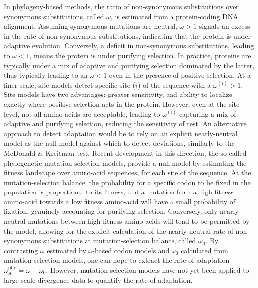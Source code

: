 \documentclass{article}
\newcommand{\rateApop}{\omega_{\mathrm{A}}}
\newcommand{\rateAphy}{\rateApop^{\mathrm{phy}}}
\begin{document}
    In phylogeny-based methods, the ratio of non-synonymous substitutions over synonymous substitutions, called $\omega$, is estimated from a protein-coding DNA alignment\cite{muse_likelihood_1994,goldman_codonbased_1994}.
    Assuming synonymous mutations are neutral, $\omega>1$ signals an excess in the rate of non-synonymous substitutions, indicating that the protein is under adaptive evolution.
    Conversely, a deficit in non-synonymous substitutions, leading to $\omega<1$, means the protein is under purifying selection.
    In practice, proteins are typically under a mix of adaptive and purifying selection dominated by the latter, thus typically leading to an $\omega<1$ even in the presence of positive selection.
    At a finer scale, site models detect specific site ($i$) of the sequence with a $\omega^{(i)}>1$\cite{yang_codonsubstitution_2000, kosiol_patterns_2008}.
    Site models have two advantages: greater sensitivity, and ability to localize exactly where positive selection acts in the protein.
    However, even at the site level, not all amino acids are acceptable, leading to $\omega^{(i)}$ capturing a mix of adaptive and purifying selection, reducing the sensitivity of test.
    An alternative approach to detect adaptation would be to rely on an explicit nearly-neutral model as the null model against which to detect deviations, similarly to the McDonald \& Kreitman test.
    Recent development in this direction, the so-called phylogenetic mutation-selection models, provide a null model by estimating the fitness landscape over amino-acid sequences, for each site of the sequence\cite{yang_mutationselection_2008, halpern_evolutionary_1998, rodrigue_mechanistic_2010}.
    At the mutation-selection balance, the probability for a specific codon to be fixed in the population is proportional to its fitness, and a mutation from a high fitness amino-acid towards a low fitness amino-acid will have a small probability of fixation, genuinely accounting for purifying selection.
    Conversely, only nearly-neutral mutations between high fitness amino acids will tend to be permitted by the model, allowing for the explicit calculation of the nearly-neutral rate of non-synonymous substitutions at mutation-selection balance, called $\omega_{0}$\cite{spielman_relationship_2015, rodrigue_detecting_2017}.
    By contrasting $\omega$ estimated by $\omega$-based codon models and $\omega_{0}$ calculated from mutation-selection models, one can hope to extract the rate of adaptation $\rateAphy = \omega - \omega_{0}$.
    However, mutation-selection models have not yet been applied to large-scale divergence data to quantify the rate of adaptation\cite{rodrigue_detecting_2017}.
\end{document}
